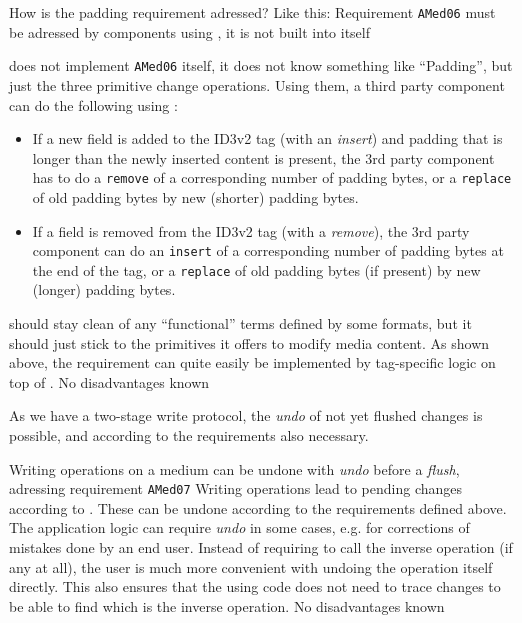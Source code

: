 How is the padding requirement adressed? Like this:
{%
Requirement \texttt{AMed06} must be adressed by components using \COMPmedia{}, it is not built into \COMPmedia{} itself
}
{%
\COMPmedia{} does not implement \texttt{AMed06} itself, it does not know something like ``Padding'', but just the three primitive change operations. Using them, a third party component can do the following using \COMPmedia{}:
\begin{itemize}
\item If a new field is added to the ID3v2 tag (with an \emph{insert}) and padding that is longer than the newly inserted content is present, the 3rd party component has to do a \texttt{remove} of a corresponding number of padding bytes, or a \texttt{replace} of old padding bytes by new (shorter) padding bytes.
\item If a field is removed from the ID3v2 tag (with a \emph{remove}), the 3rd party component can do an \texttt{insert} of a corresponding number of padding bytes at the end of the tag, or a \texttt{replace} of old padding bytes (if present) by new (longer) padding bytes.
\end{itemize}
}
{%
\COMPmedia{} should stay clean of any ``functional'' terms defined by some formats, but it should just stick to the primitives it offers to modify media content. As shown above, the requirement can quite easily be implemented by tag-specific logic on top of \COMPmedia{}.
}
{%
No disadvantages known
}

As we have a two-stage write protocol, the \emph{undo} of not yet flushed changes is possible, and according to the requirements also necessary.

{%
Writing operations on a medium can be undone with \emph{undo} before a \emph{flush}, adressing requirement \texttt{AMed07}
}
{%
Writing operations lead to pending changes according to . These can be undone according to the requirements defined above.
}
{%
The application logic can require \emph{undo} in some cases, e.g. for corrections of mistakes done by an end user. Instead of requiring to call the inverse operation (if any at all), the user is much more convenient with undoing the operation itself directly. This also ensures that the using code does not need to trace changes to be able to find which is the inverse operation.
}
{%
No disadvantages known
}

